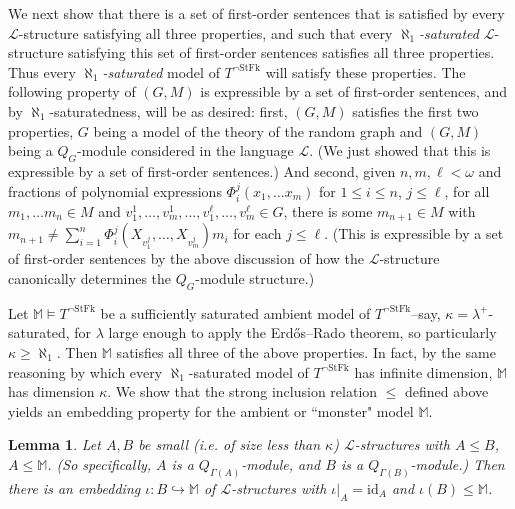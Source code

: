 \documentclass{amsart}
\newtheorem{lemma}[theorem]{Lemma}
\theoremstyle{definition}
\theoremstyle{remark}
\numberwithin{equation}{section}
\begin{document}
We next show that there is a set of first-order sentences that is satisfied by every $\mathcal{L}$-structure satisfying all three properties, and such that every \textit{$\aleph_{1}$-saturated} $\mathcal{L}$-structure satisfying this set of first-order sentences satisfies all three properties. Thus every \textit{$\aleph_{1}$-saturated} model of $T^{\neg\mathrm{StFk}}$ will satisfy these properties. The following property of $(G, M)$ is expressible by a set of first-order sentences, and by $\aleph_{1}$-saturatedness, will be as desired: first, $(G, M)$ satisfies the first two properties, $G$ being a model of the theory of the random graph and $(G, M)$ being a $Q_{G}$-module considered in the language $\mathcal{L}$. (We just showed that this is expressible by a set of first-order sentences.) And second, given $n, m, \ell < \omega$ and fractions of polynomial expressions $\Phi^{j}_{i}(x_{1}, \ldots x_{m} )$ for $1 \leq i \leq n$, $j \leq \ell$, for all $m_{1}, \ldots m_{n} \in M$ and $v^{1}_{1}, \ldots, v^{1}_{m}, \ldots, v^{\ell}_{1}, \ldots, v^{\ell}_{m}  \in G$, there is some $m_{n+1} \in M$ with $m_{n+1} \neq \sum^{n}_{i =1} \Phi^{j}_{i}(X_{v^{j}_{1}}, \ldots, X_{v^{j}_{m}}) m_{i}$ for each $j \leq \ell$. (This is expressible by a set of first-order sentences by the above discussion of how the $\mathcal{L}$-structure canonically determines the $Q_{G}$-module structure.)

Let $\mathbb{M} \models T^{\neg \mathrm{StFk}}$ be a sufficiently saturated ambient model of $T^{\neg \mathrm{StFk}}$--say, $\kappa=\lambda^{+}$-saturated, for $\lambda$ large enough to apply the Erdős–Rado theorem, so particularly $\kappa \geq \aleph_{1}$. Then $\mathbb{M}$ satisfies all three of the above properties. In fact, by the same reasoning by which every $\aleph_{1}$-saturated model of $T^{\neg \mathrm{StFk}}$ has infinite dimension, $\mathbb{M}$ has dimension $\kappa$. We show that the strong inclusion relation $\leq$ defined above yields an embedding property for the ambient or ``monster" model $\mathbb{M}$.

\begin{lemma}\label{embedding property for strong inclusions}
    Let $A, B$ be small (i.e. of size less than $\kappa$) $\mathcal{L}$-structures with $A \leq B$, $A \leq \mathbb{M}$. (So specifically, $A$ is a $Q_{\Gamma(A)}$-module, and $B$ is a $Q_{\Gamma(B)}$-module.) Then there is an embedding $\iota: B \hookrightarrow \mathbb{M}$ of $\mathcal{L}$-structures with $\iota|_{A}=\mathrm{id}_{A}$ and $\iota(B) \leq \mathbb{M}$.
\end{lemma}
\end{document}
